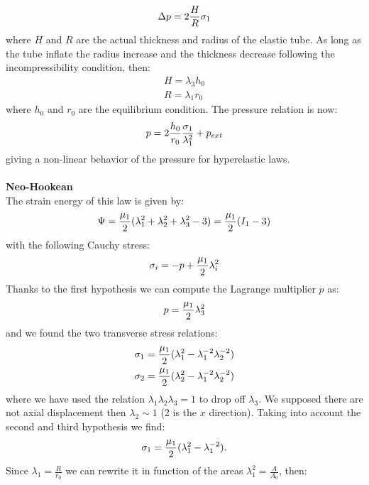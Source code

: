 \documentclass[12pt,a4paper]{article}
\numberwithin{equation}{section}
\begin{document}
 \begin{align}
\Delta p = 2 { H \over R} \sigma_1
 \end{align}
  where $H$ and $R$ are the actual thickness and radius of the elastic tube. As long as the tube inflate the radius increase and the thickness decrease following the incompressibility condition, then:
\begin{align}
H = \lambda_3 h_0 \\
R = \lambda_1 r_0
\end{align}
where $h_0$ and $r_0$ are the equilibrium condition. The pressure relation is now:
\begin{align} \label{eq:pression-stress}
p = 2 { h_0 \over r_0} {\sigma_1 \over \lambda_1^2} + p_{ext}
\end{align}
 giving a non-linear behavior of the pressure for hyperelastic laws.\\
 \\
{\bf Neo-Hookean}\\
The strain energy of this law is given by:
\begin{equation} %
\Psi = {\mu_1 \over 2}(  \lambda^{2}_1+ \lambda^{2}_2+ \lambda^{2}_3 -3 ) = {\mu_1 \over 2} (I_1 -3 )
\end{equation}
with the following Cauchy stress: 
\begin{equation} 
\sigma_i=  -p +  {\mu_1 \over 2}  \lambda_i^{2}
\end{equation}
Thanks to the first hypothesis we can compute the Lagrange multiplier $p$ as: 
\begin{equation} 
p = {\mu_1 \over 2}  \lambda_3^{2}
\end{equation}
and we found the two transverse stress relations: 
\begin{align} 
\sigma_1=  {\mu_1 \over 2} (\lambda_1^{2} - \lambda_1^{-2}\lambda_2^{-2} )\\
\sigma_2=  {\mu_1 \over 2}  (\lambda_2^{2} - \lambda_1^{-2}\lambda_2^{-2} )
\end{align} 
where we have used the relation  $\lambda_1 \lambda_2 \lambda_3 = 1$ to drop off $\lambda_3$. We supposed there are not axial displacement then $\lambda_2 \sim 1$ (2 is the $x$ direction). Taking into account the second and third hypothesis we find:
\begin{equation} 
\sigma_1=  {\mu_1 \over 2} (\lambda_1^{2} - \lambda_1^{-2}).
\end{equation}
 Since $\lambda_1 = \frac{R}{r_0}$ we can rewrite it in function of the areas $\lambda_1^2 = \frac{A}{A_0}$, then:
\end{document}
